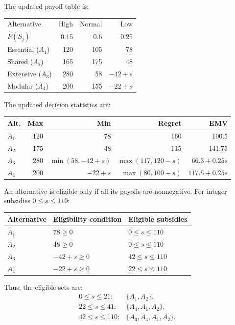 The updated payoff table is:

\begin{center}\small\setlength{\tabcolsep}{4pt}
	\begin{tabular}{lrrr}\toprule
		Alternative & High & Normal & Low\\
		$P(S_j)$ & 0.15 & 0.6 & 0.25\\ \midrule
				Essential ($A_1$) & 120 & 105 & 78\\
		Shared ($A_2$) & 165 & 175 & 48\\
		Extensive ($A_3$) & 280 & 58 & $-42+s$\\
		Modular ($A_4$) & 200 & 155 & $-22+s$\\
		\bottomrule
	\end{tabular}
\end{center}

The updated decision statistics are:

\begin{center}\small\setlength{\tabcolsep}{4pt}
	\begin{tabular}{lrrrr}\toprule
		Alt. & Max & Min & Regret & EMV\\ \midrule
				$A_1$ & 120 & 78 & 160 & 100.5\\
		$A_2$ & 175 & 48 & 115 & 141.75\\
		$A_3$ & 280 & $\min(58,-42+s)$ & $\max(117,120-s)$ & $66.3+0.25s$\\
		$A_4$ & 200 & $-22+s$ & $\max(80,100-s)$ & $117.5+0.25s$\\
		\bottomrule
	\end{tabular}
\end{center}

An alternative is eligible only if all its payoffs are nonnegative.
For integer subsidies $0\le s\le110$:

\begin{center}
\begin{tabular}{lll}\toprule
Alternative & Eligibility condition & Eligible subsidies\\\midrule
$A_1$ & $78\ge0$ & $0\le s\le110$\\
$A_2$ & $48\ge0$ & $0\le s\le110$\\
$A_3$ & $-42+s\ge0$ & $42\le s\le110$\\
$A_4$ & $-22+s\ge0$ & $22\le s\le110$\\
\bottomrule
\end{tabular}
\end{center}

Thus, the eligible sets are:
\[
\begin{array}{ll}
0\le s\le21: & \{A_1,A_2\},\\
22\le s\le41: & \{A_4,A_1,A_2\},\\
42\le s\le110: & \{A_3,A_4,A_1,A_2\}.
\end{array}
\]

